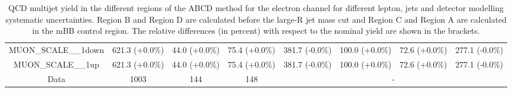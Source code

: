 \begin{table}[htbp!]
\begin{tiny}
\begin{center}
\begin{tabular}{c|c|c|c||c|c|c|c}
MUON\_SCALE\_\_1down                                         & 621.3     (+0.0\%) & 44.0      (+0.0\%) & 75.4      (+0.0\%) & 381.7     (-0.0\%) & 100.0     (+0.0\%) & 72.6      (+0.0\%) & 277.1     (-0.0\%) \\ 
MUON\_SCALE\_\_1up                                           & 621.3     (+0.0\%) & 44.0      (+0.0\%) & 75.4      (+0.0\%) & 381.7     (-0.0\%) & 100.0     (+0.0\%) & 72.6      (+0.0\%) & 277.1     (-0.0\%) \\ 
\hline 
\hline 
Data                                                        & 1003  & 144   & 148  &\multicolumn{4}{c}{-} \\ 
\hline
\end{tabular}
\end{center}
\caption{QCD multijet yield in the different regions of the ABCD method for the electron channel for 
different lepton, jets and \met detector modelling systematic uncertainties. Region B and Region D are calculated before the large-R jet mass cut 
and Region C and Region A are calculated in the mBB control region. The relative differences (in percent) with respect to the nominal yield are shown in the 
brackets.}
\label{tab:boosted_qcd_detsyst_elec_mbbcr_1}
\end{tiny}
\end{table} 
%
%
